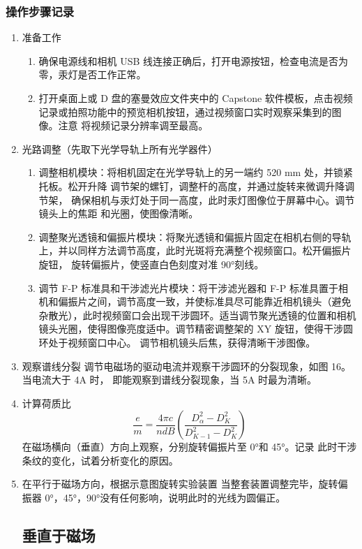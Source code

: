 \documentclass[dvipsnames, svgnames,a4paper,11pt]{article}
\begin{document}
	\subsubsection{操作步骤记录}
	\begin{enumerate}
		\item 准备工作
		\begin{enumerate}
		\item 确保电源线和相机 USB 线连接正确后，打开电源按钮，检查电流是否为
		零，汞灯是否工作正常。
		\item 打开桌面上或 D 盘的塞曼效应文件夹中的 Capstone 软件模板，点击视频
		记录或拍照功能中的预览相机按钮，通过视频窗口实时观察采集到的图像。注意
		将视频记录分辨率调至最高。
	\end{enumerate}	
		\item 光路调整（先取下光学导轨上所有光学器件）
		\begin{enumerate}
			\item 调整相机模块：将相机固定在光学导轨上的另一端约 520 mm 处，并锁紧
		托板。松开升降 调节架的螺钉，调整杆的高度，并通过旋转来微调升降调节架，
		确保相机与汞灯处于同一高度，此时汞灯图像位于屏幕中心。调节镜头上的焦距
		和光圈，使图像清晰。
		\item 调整聚光透镜和偏振片模块：将聚光透镜和偏振片固定在相机右侧的导轨
		上，并以同样方法调节高度，此时光斑将充满整个视频窗口。松开偏振片旋钮，
		旋转偏振片，使竖直白色刻度对准 90°刻线。
		\item 调节 F-P 标准具和干涉滤光片模块：将干涉滤光器和 F-P 标准具置于相机和偏振片之间，调节高度一致，并使标准具尽可能靠近相机镜头（避免杂散光），此时视频窗口会出现干涉圆环。适当调节聚光透镜的位置和相机镜头光圈，使得图像亮度适中。调节精密调整架的 XY 旋钮，使得干涉圆环处于视频窗口中心。
		调节相机镜头后焦，获得清晰干涉图像。

	\end{enumerate}	
	\item 观察谱线分裂
	调节电磁场的驱动电流并观察干涉圆环的分裂现象，如图 16。当电流大于 4A 时，
	即能观察到谱线分裂现象，当 5A 时最为清晰。
	\item 计算荷质比
	\[
				\frac{e}{m} = \frac{4\pi c}{n d B}(\frac{D^2_\alpha - D^2_K}{D^2_{K-1} - D^2_{K}})
			\]
			在磁场横向（垂直）方向上观察，分别旋转偏振片至 0°和 45°。记录
此时干涉条纹的变化，试着分析变化的原因。
\item 在平行于磁场方向，根据示意图旋转实验装置
当整套装置调整完毕，旋转偏振器 0°，45°，90°没有任何影响，说明此时的光线为圆偏正。
\subsection{垂直于磁场}
\end{enumerate}	
	
\end{document}
